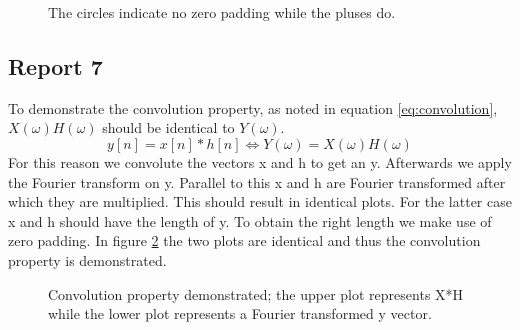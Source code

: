 \documentclass[final]{scrreprt} %
\begin{document}
\begin{figure}[H]
    \centering
	\setlength\figureheight{6cm}
    	\setlength\figurewidth{14cm}
	
	\caption{The circles indicate no zero padding while the pluses do.}
	\label{fig:zeropadding}
\end{figure}

\subsection{Report 7}
To demonstrate the convolution property, as noted in equation \ref{eq:convolution}, $X(\omega)H(\omega)$ should be identical to $Y(\omega)$.
\begin{equation}
y[n] = x[n] * h[n] \Leftrightarrow Y(\omega) = X(\omega)H(\omega)
\label{eq:convolution}
\end{equation}
For this reason we convolute the vectors x and h to get an y. 
Afterwards we apply the Fourier transform on y.
Parallel to this x and h are Fourier transformed after which they are multiplied.
This should result in identical plots.
For the latter case x and h should have the length of y.
To obtain the right length we make use of zero padding.
In figure \ref{fig:convolution} the two plots are identical and thus the convolution property is demonstrated.

\begin{figure}[H]
    \centering
	\setlength\figureheight{6cm}
    	\setlength\figurewidth{14cm}
	
	\caption{Convolution property demonstrated; the upper plot represents X*H while the lower plot represents a Fourier transformed y vector.}
	\label{fig:convolution}
\end{figure}
\end{document}
